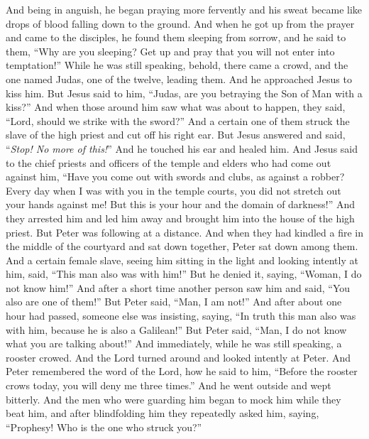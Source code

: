\begin{biblechapter}
{\verse And being in anguish, he began praying more fervently and his sweat became like drops of blood falling down to the ground.}
\verse And when he got up from the prayer and came to the disciples, he found them sleeping from sorrow,
\verse and he said to them, “Why are you sleeping? Get up and pray that you will not enter into temptation!”
 While he was still speaking, behold, there came a crowd, and the one named Judas, one of the twelve, leading them. And he approached Jesus to kiss him.
\verse But Jesus said to him, “Judas, are you betraying the Son of Man with a kiss?”
\verse And when those around him saw what was about to happen, they said, “Lord, should we strike with the sword?”
\verse And a certain one of them struck the slave of the high priest and cut off his right ear.
\verse But Jesus answered and said, “\textit{Stop! No more of this!}” And he touched his ear and healed him.
\verse And Jesus said to the chief priests and officers of the temple and elders who had come out against him, “Have you come out with swords and clubs, as against a robber?
\verse Every day when I was with you in the temple courts, you did not stretch out your hands against me! But this is your hour and the domain of darkness!”
 And they arrested him and led him away and brought him into the house of the high priest. But Peter was following at a distance.
\verse And when they had kindled a fire in the middle of the courtyard and sat down together, Peter sat down among them.
\verse And a certain female slave, seeing him sitting in the light and looking intently at him, said, “This man also was with him!”
\verse But he denied it, saying, “Woman, I do not know him!”
\verse And after a short time another person saw him and said, “You also are one of them!” But Peter said, “Man, I am not!”
\verse And after about one hour had passed, someone else was insisting, saying, “In truth this man also was with him, because he is also a Galilean!”
\verse But Peter said, “Man, I do not know what you are talking about!” And immediately, while he was still speaking, a rooster crowed.
\verse And the Lord turned around and looked intently at Peter. And Peter remembered the word of the Lord, how he said to him, “Before the rooster crows today, you will deny me three times.”
\verse And he went outside and wept bitterly.
\verse And the men who were guarding him began to mock him while they beat him,
\verse and after blindfolding him they repeatedly asked him, saying, “Prophesy! Who is the one who struck you?”

\end{biblechapter}
